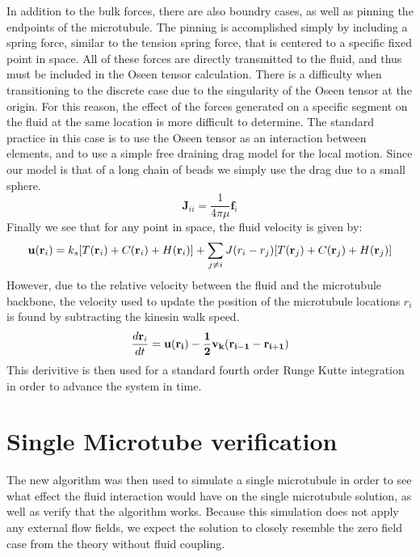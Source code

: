\documentclass[11pt]{ucthesis}
\def\br{{\bf r}}
\begin{document}
In addition to the bulk forces, there are also boundry cases, as well as pinning the endpoints of the microtubule. The pinning is accomplished simply by including a spring force, similar to the tension spring force, that is centered to a specific fixed point in space.
All of these forces are directly transmitted to the fluid, and thus must be included in the Oseen tensor calculation. There is a difficulty when transitioning to the discrete case due to the singularity of the Oseen tensor at the origin. 
For this reason, the effect of the forces generated on a specific segment on the fluid at the same location is more difficult to determine.
The standard practice in this case is to use the Oseen tensor as an interaction between elements, and to use a simple free draining drag model for the local motion. Since our model is that of a long chain of beads we simply use the drag due to a small sphere.
\begin{equation}
\label{eq:discretesum}
\mathbf{J}_{ii} = \frac{1}{4\pi\mu} \mathbf{f}_i
\end{equation}
Finally we see that for any point in space, the fluid velocity is given by:
\begin{equation}
\label{eq:discretesum}
\mathbf{u}(\br_i) = k_s[T(\br_i) + C(\br_i) + H(\br_i)] + \sum_{j\neq i} J(r_i - r_j) [T(\br_j) + C(\br_j)+ H(\br_j)]
\end{equation}
However, due to the relative velocity between the fluid and the microtubule backbone, the velocity used to update the position of the microtubule locations $r_i$ is found by subtracting the kinesin walk speed.
\begin{equation}
\label{eq:discretevel}
\frac{d \br_i}{dt} = \bf u(\br_i) - \frac{1}{2}v_k (\br_{i-1} - \br_{i+1})
\end{equation}
This derivitive is then used for a standard fourth order Runge Kutte integration in order to advance the system in time.

\section{Single Microtube verification}
The new algorithm was then used to simulate a single microtubule in order to see what effect the fluid interaction would have on the single microtubule solution, as well as verify that the algorithm works.
Because this simulation does not apply any external flow fields, we expect the solution to closely resemble the zero field case from the theory without fluid coupling.
\end{document}
